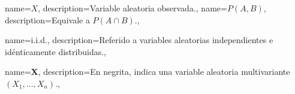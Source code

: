 {
  name={$X$},
  description={Variable aleatoria observada.},
}
{
  name={$P(A,B)$},
  description={Equivale a $P(A\cap B)$.},
}

{
  name={i.i.d.},
  description={Referido a variables aleatorias independientes e idénticamente distribuidas.},
}

{
  name={\textbf{X}},
  description={En negrita, indica una variable aleatoria multivariante $(X_{1},\dots,X_{n})$.},
}
